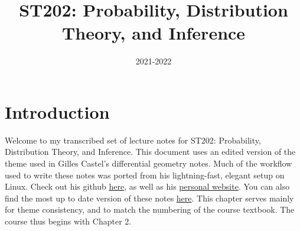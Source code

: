 \documentclass[a4paper]{report}
\title{\Huge\textsf{ST202: Probability, Distribution Theory, and Inference}}
\affil{\vskip.5cm\textsf{The London School of Economics and Political Science}}
\date{\textsf{2021-2022}}
\begin{document}
    \maketitle
    \tableofcontents
	\clearpage
\chapter{Introduction}
Welcome to my transcribed set of lecture notes for ST202: Probability, Distribution Theory, and Inference. This document uses an edited version of the theme used in Gilles Castel's differential geometry notes. Much of the workflow used to write these notes was ported from his lightning-fast, elegant setup on Linux. Check out his github \href{https://github.com/gillescastel}{here}, as well as his \href{https://castel.dev/}{personal website}. You can also find the most up to date version of these notes \href{https://github.com/meshkinyar/lecture-notes/tree/main/st202}{here}. This chapter serves mainly for theme consistency, and to match the numbering of the course textbook. The course thus begins with Chapter 2.
    
    
    
    
    
    
    
    
    
    
    
    
    
    
    
    
    
    
    
    
    
    
    
    
    
    
    
    
    
    
    
    
    
    
    
    
    
    
    
    
    
    
\end{document}
